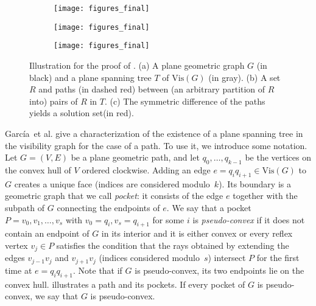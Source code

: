 \documentclass[a4paper,runningheads,cleveref,thm-restate]{lipics-v2021}
\newcommand{\Vis}[1]{\ensuremath{\mathrm{Vis}(#1)}}
\newcommand{\hset}{solution set\xspace}
\newcommand{\pseudoconvex}{pseudo-convex\xspace}
\newcommand{\etal}{{et al.}\xspace}
\begin{document}
\begin{figure}[htb]
	\centering
	\begin{subfigure}{.3\textwidth}
		\centering
		\texttt{[image: figures\_final]}
		\caption{}
		\label{fig:spanningTreeA}
	\end{subfigure}\hfil
	\begin{subfigure}{.3\textwidth}
		\centering
		\texttt{[image: figures\_final]}
		\caption{}
		\label{fig:spanningTreeB}
	\end{subfigure}\hfil
	\begin{subfigure}{.3\textwidth}
		\centering
		\texttt{[image: figures\_final]}
		\caption{}
		\label{fig:spanningTreeC}
	\end{subfigure}\hfil
	\caption{Illustration for the proof of . {(a) A plane geometric graph $G$ (in black) and a plane spanning tree $T$ of \Vis{G} (in gray). (b) A set $R$ and paths (in dashed red) between (an arbitrary partition of $R$ into) pairs of $R$ in $T$. (c) The symmetric difference of the paths yields a \hset (in red).}}
	\label{fig:spanningTree}
\end{figure}



Garc\'ia~\etal\cite{GARCIA2014} give a characterization of the existence of a plane spanning tree in the visibility graph for the case of a path. 
To use it, we introduce some notation. 
Let $G = (V,E)$ be a plane geometric path, and let $q_0, \dots, q_{k-1}$ be the vertices on the convex hull of $V$ ordered clockwise. 
Adding an edge $e = q_{i}q_{i+1}\in \Vis{G}$ to $G$ creates a unique face (indices are considered modulo~$k$). 
Its boundary is a geometric graph that we call \emph{pocket}: 
it consists of the edge $e$ together with the subpath of $G$ connecting the endpoints of $e$.  
We say that a pocket $P = v_{0},v_{1}, \dots, v_{s}$ with $v_{0} = q_{i}, v_{s} = q_{i+1}$ for some $i$ is \emph{\pseudoconvex} if 
it does not contain an endpoint of $G$ in its interior and it is either convex or  every reflex vertex  $v_{j} \in P$  
satisfies the condition that the rays obtained by extending the edges $v_{j-1}v_{j}$ and $v_{j+1}v_{j}$ (indices considered modulo~$s$) intersect $P$ for the first time at $e = q_{i}q_{i+1}$. 
Note that if $G$ is \pseudoconvex, its two endpoints lie on the convex hull.
 illustrates a path and its pockets. 
If every pocket of $G$ is \pseudoconvex, we say that $G$ is \pseudoconvex. 
\end{document}
